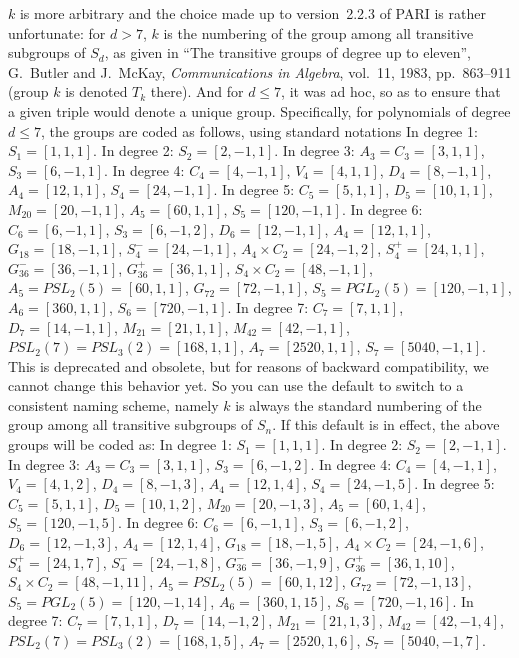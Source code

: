 $k$ is more arbitrary and the choice made up to version~2.2.3 of PARI is rather
unfortunate: for $d > 7$, $k$ is the numbering of the group among all
transitive subgroups of $S_d$, as given in ``The transitive groups of degree up
to eleven'', G.~Butler and J.~McKay, \emph{Communications in Algebra}, vol.~11,
1983,
pp.~863--911 (group $k$ is denoted $T_k$ there). And for $d \leq 7$, it was ad
hoc, so as to ensure that a given triple would denote a unique group.
Specifically, for polynomials of degree $d\leq 7$, the groups are coded as
follows, using standard notations
\smallskip
In degree 1: $S_1=[1,1,1]$.
\smallskip
In degree 2: $S_2=[2,-1,1]$.
\smallskip
In degree 3: $A_3=C_3=[3,1,1]$, $S_3=[6,-1,1]$.
\smallskip
In degree 4: $C_4=[4,-1,1]$, $V_4=[4,1,1]$, $D_4=[8,-1,1]$, $A_4=[12,1,1]$,
$S_4=[24,-1,1]$.
\smallskip
In degree 5: $C_5=[5,1,1]$, $D_5=[10,1,1]$, $M_{20}=[20,-1,1]$,
$A_5=[60,1,1]$, $S_5=[120,-1,1]$.
\smallskip
In degree 6: $C_6=[6,-1,1]$, $S_3=[6,-1,2]$, $D_6=[12,-1,1]$, $A_4=[12,1,1]$,
$G_{18}=[18,-1,1]$, $S_4^-=[24,-1,1]$, $A_4\times C_2=[24,-1,2]$,
$S_4^+=[24,1,1]$, $G_{36}^-=[36,-1,1]$, $G_{36}^+=[36,1,1]$,
$S_4\times C_2=[48,-1,1]$, $A_5=PSL_2(5)=[60,1,1]$, $G_{72}=[72,-1,1]$,
$S_5=PGL_2(5)=[120,-1,1]$, $A_6=[360,1,1]$, $S_6=[720,-1,1]$.
\smallskip
In degree 7: $C_7=[7,1,1]$, $D_7=[14,-1,1]$, $M_{21}=[21,1,1]$,
$M_{42}=[42,-1,1]$, $PSL_2(7)=PSL_3(2)=[168,1,1]$, $A_7=[2520,1,1]$,
$S_7=[5040,-1,1]$.
\smallskip
This is deprecated and obsolete, but for reasons of backward compatibility,
we cannot change this behavior yet. So you can use the default
 to switch to a consistent naming scheme, namely $k$ is
always the standard numbering of the group among all transitive subgroups of
$S_n$. If this default is in effect, the above groups will be coded as:
\smallskip
In degree 1: $S_1=[1,1,1]$.
\smallskip
In degree 2: $S_2=[2,-1,1]$.
\smallskip
In degree 3: $A_3=C_3=[3,1,1]$, $S_3=[6,-1,2]$.
\smallskip
In degree 4: $C_4=[4,-1,1]$, $V_4=[4,1,2]$, $D_4=[8,-1,3]$, $A_4=[12,1,4]$,
$S_4=[24,-1,5]$.
\smallskip
In degree 5: $C_5=[5,1,1]$, $D_5=[10,1,2]$, $M_{20}=[20,-1,3]$,
$A_5=[60,1,4]$, $S_5=[120,-1,5]$.
\smallskip
In degree 6: $C_6=[6,-1,1]$, $S_3=[6,-1,2]$, $D_6=[12,-1,3]$, $A_4=[12,1,4]$,
$G_{18}=[18,-1,5]$, $A_4\times C_2=[24,-1,6]$, $S_4^+=[24,1,7]$,
$S_4^-=[24,-1,8]$, $G_{36}^-=[36,-1,9]$, $G_{36}^+=[36,1,10]$,
$S_4\times C_2=[48,-1,11]$, $A_5=PSL_2(5)=[60,1,12]$, $G_{72}=[72,-1,13]$,
$S_5=PGL_2(5)=[120,-1,14]$, $A_6=[360,1,15]$, $S_6=[720,-1,16]$.
\smallskip
In degree 7: $C_7=[7,1,1]$, $D_7=[14,-1,2]$, $M_{21}=[21,1,3]$,
$M_{42}=[42,-1,4]$, $PSL_2(7)=PSL_3(2)=[168,1,5]$, $A_7=[2520,1,6]$,
$S_7=[5040,-1,7]$.
\smallskip

